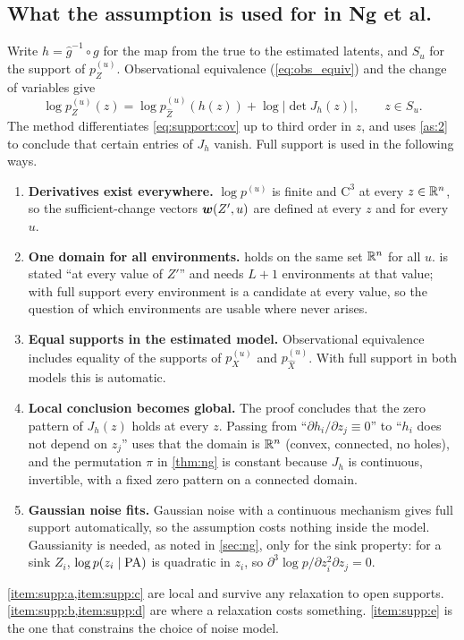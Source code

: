 \subsection{What the assumption is used for in Ng et al.}
\label{app:support:why}
Write $h=\hat g^{-1}\circ g$ for the map from the true to the estimated latents, and $S_u$ for the support of
$p^{(u)}_Z$. Observational equivalence (\cref{eq:obs_equiv}) and the change of variables give
\begin{equation}
\log p^{(u)}_Z(z)=\log p^{(u)}_{\hat Z}(h(z))+\log\bigl|\det J_h(z)\bigr|,\qquad z\in S_u.
\label{eq:support:cov}
\end{equation}
The method differentiates \cref{eq:support:cov} up to third order in $z$, and uses \cref{as:2} to 
conclude that certain entries of $J_h$ vanish. Full support is used in the following ways.
\begin{enumerate}[label=(\alph*),leftmargin=2em]
\item \textbf{Derivatives exist everywhere.}\label{item:supp:a} $\log p^{(u)}$ is finite and 
      $\mathrm{C}^3$ at every $z\in\mathbb{R}^n$, so the sufficient-change vectors $\boldsymbol{w}(Z',u)$ are 
      defined at every $z$ and for every $u$.
\item \textbf{One domain for all environments.}\label{item:supp:b}  holds on 
      the same set $\mathbb{R}^n$ for all $u$.  is stated ``at every value of $Z'$'' and needs 
      $L+1$ environments at that value; with full support every environment is a candidate at every 
      value, so the question of which environments are usable where never arises.
\item \textbf{Equal supports in the estimated model.}\label{item:supp:c} Observational equivalence 
      includes equality of the supports of $p_X^{(u)}$ and $p_{\hat X}^{(u)}$. With full support in 
      both models this is automatic.
\item \textbf{Local conclusion becomes global.}\label{item:supp:d} The proof concludes that the zero 
      pattern of $J_h(z)$ holds at every $z$. Passing from ``$\partial h_i/\partial z_j\equiv 0$'' 
      to ``$h_i$ does not depend on $z_j$'' uses that the domain is $\mathbb{R}^n$ (convex, connected, no 
      holes), and the permutation $\pi$ in \cref{thm:ng} is constant because $J_h$ is continuous, 
      invertible, with a fixed zero pattern on a connected domain.
\item \textbf{Gaussian noise fits.}\label{item:supp:e} Gaussian noise with a continuous mechanism 
      gives full support automatically, so the assumption costs nothing inside the model.    
      Gaussianity is needed, as noted in \cref{sec:ng}, only for the sink property: for a sink 
      $Z_i$, $\log p(z_i\mid\mathrm{PA})$ is quadratic in $z_i$, so 
      $\partial^3\log p/\partial z_i^2\partial z_j=0$.
\end{enumerate}
\cref{item:supp:a,item:supp:c} are local and survive any relaxation to open supports. 
\cref{item:supp:b,item:supp:d} are where a relaxation costs something. 
\cref{item:supp:e} is the one that constrains the choice of noise model.

